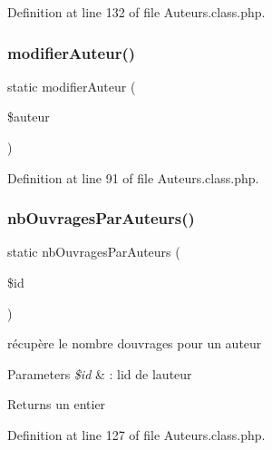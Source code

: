Definition at line 132 of file Auteurs.\+class.\+php.

\mbox{\label{class_auteurs_a5f90bcbe10e2c15932d5f04e9a44e83f}} 
\subsubsection{\texorpdfstring{modifier\+Auteur()}{modifierAuteur()}}
{\footnotesize\ttfamily static modifier\+Auteur (\begin{DoxyParamCaption}\item[{}]{\$auteur }\end{DoxyParamCaption})\hspace{0.3cm}{\ttfamily [static]}}



Definition at line 91 of file Auteurs.\+class.\+php.

\mbox{\label{class_auteurs_a55283b4d022eca02905196418e4a8535}} 
\subsubsection{\texorpdfstring{nb\+Ouvrages\+Par\+Auteurs()}{nbOuvragesParAuteurs()}}
{\footnotesize\ttfamily static nb\+Ouvrages\+Par\+Auteurs (\begin{DoxyParamCaption}\item[{}]{\$id }\end{DoxyParamCaption})\hspace{0.3cm}{\ttfamily [static]}}

récupère le nombre d\textquotesingle{}ouvrages pour un auteur 
\begin{DoxyParams}{Parameters}
{\em \$id} & \+: l\textquotesingle{}id de l\textquotesingle{}auteur \\
\hline
\end{DoxyParams}
\begin{DoxyReturn}{Returns}
un entier 
\end{DoxyReturn}


Definition at line 127 of file Auteurs.\+class.\+php.

\mbox{\label{class_auteurs_abdb96363f4fa17b65d7fc97e18993579}} 
